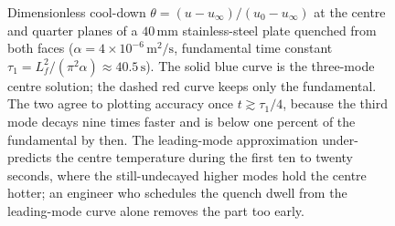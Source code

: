 \begin{figure}[htbp]
\centering
{}
\caption[Quenched-plate cool-down history]{Dimensionless cool-down
$\theta = (u - u_\infty)/(u_0 - u_\infty)$ at the centre and quarter
planes of a $40\,\si{\milli\meter}$ stainless-steel plate quenched
from both faces ($\alpha = 4\times 10^{-6}\,\si{\meter\squared\per
\second}$, fundamental time constant $\tau_1 = L_f^2/(\pi^2\alpha)
\approx 40.5\,\si{\second}$). The solid blue curve is the three-mode
centre solution; the dashed red curve keeps only the fundamental.
The two agree to plotting accuracy once $t \gtrsim \tau_1/4$, because
the third mode decays nine times faster and is below one percent of
the fundamental by then. The leading-mode approximation
under-predicts the centre temperature during the first ten to twenty
seconds, where the still-undecayed higher modes hold the centre
hotter; an engineer who schedules the quench dwell from the
leading-mode curve alone removes the part too early.}
\label{fig:vol02:ch12:quench-history}
\end{figure}
